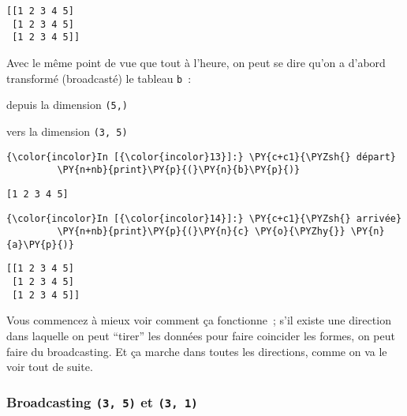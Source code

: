     \begin{Verbatim}[commandchars=\\\{\},frame=single,framerule=0.3mm,rulecolor=\color{cellframecolor}]
[[1 2 3 4 5]
 [1 2 3 4 5]
 [1 2 3 4 5]]
\end{Verbatim}

    Avec le même point de vue que tout à l'heure, on peut se dire qu'on a
d'abord transformé (broadcasté) le tableau \texttt{b}~:

    depuis la dimension \texttt{(5,)}

    vers la dimension \texttt{(3,\ 5)}

    \begin{Verbatim}[commandchars=\\\{\},frame=single,framerule=0.3mm,rulecolor=\color{cellframecolor}]
{\color{incolor}In [{\color{incolor}13}]:} \PY{c+c1}{\PYZsh{} départ}
         \PY{n+nb}{print}\PY{p}{(}\PY{n}{b}\PY{p}{)}
\end{Verbatim}


    \begin{Verbatim}[commandchars=\\\{\},frame=single,framerule=0.3mm,rulecolor=\color{cellframecolor}]
[1 2 3 4 5]
\end{Verbatim}

    \begin{Verbatim}[commandchars=\\\{\},frame=single,framerule=0.3mm,rulecolor=\color{cellframecolor}]
{\color{incolor}In [{\color{incolor}14}]:} \PY{c+c1}{\PYZsh{} arrivée}
         \PY{n+nb}{print}\PY{p}{(}\PY{n}{c} \PY{o}{\PYZhy{}} \PY{n}{a}\PY{p}{)}
\end{Verbatim}


    \begin{Verbatim}[commandchars=\\\{\},frame=single,framerule=0.3mm,rulecolor=\color{cellframecolor}]
[[1 2 3 4 5]
 [1 2 3 4 5]
 [1 2 3 4 5]]
\end{Verbatim}

    Vous commencez à mieux voir comment ça fonctionne~; s'il existe une
direction dans laquelle on peut ``tirer'' les données pour faire
coincider les formes, on peut faire du broadcasting. Et ça marche dans
toutes les directions, comme on va le voir tout de suite.

    \hypertarget{broadcasting-3-5-et-3-1}{%
\subsubsection{\texorpdfstring{Broadcasting \texttt{(3,\ 5)} et
\texttt{(3,\ 1)}}{Broadcasting (3, 5) et (3, 1)}}\label{broadcasting-3-5-et-3-1}}


